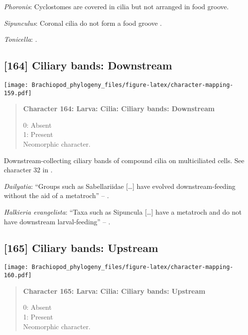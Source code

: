 \documentclass[openany]{book}
\theoremstyle{definition}
\theoremstyle{definition}
\theoremstyle{definition}
\theoremstyle{remark}
\begin{document}
\hypertarget{Phoronis-coding-163}{}
\emph{Phoronis}: Cyclostomes are covered in cilia but not arranged in
food groove.

\hypertarget{Sipunculus-coding-163}{}
\emph{Sipunculus}: Coronal cilia do not form a food groove
\citep{Reed1982}.

\hypertarget{Tonicella-coding-163}{}
\emph{Tonicella}: \citet{Williams1997Introduction}.

\subsection*{{[}164{]} Ciliary bands:
Downstream}\label{ciliary-bands-downstream}

\texttt{[image: Brachiopod\_phylogeny\_files/figure-latex/character-mapping-159.pdf]}

\begin{quote}
\textbf{Character 164: Larva: Cilia: Ciliary bands: Downstream}

0: Absent\\
1: Present\\
Neomorphic character.
\end{quote}

Downstream-collecting ciliary bands of compound cilia on multiciliated
cells. See character 32 in \citet{Glenner2004}.

\hypertarget{Dailyatia-coding-164}{}
\emph{Dailyatia}: ``Groups such as Sabellariidae {[}\ldots{}{]} have
evolved downstream-feeding without the aid of a metatroch'' --
\citep{Rouse2000}.

\hypertarget{Halkieria_evangelista-coding-164}{}
\emph{Halkieria evangelista}: ``Taxa such as Sipuncula {[}\ldots{}{]}
have a metatroch and do not have downstream larval-feeding'' --
\citet{Rouse2000}.

\subsection*{{[}165{]} Ciliary bands:
Upstream}\label{ciliary-bands-upstream}

\texttt{[image: Brachiopod\_phylogeny\_files/figure-latex/character-mapping-160.pdf]}

\begin{quote}
\textbf{Character 165: Larva: Cilia: Ciliary bands: Upstream}

0: Absent\\
1: Present\\
Neomorphic character.
\end{quote}
\end{document}
